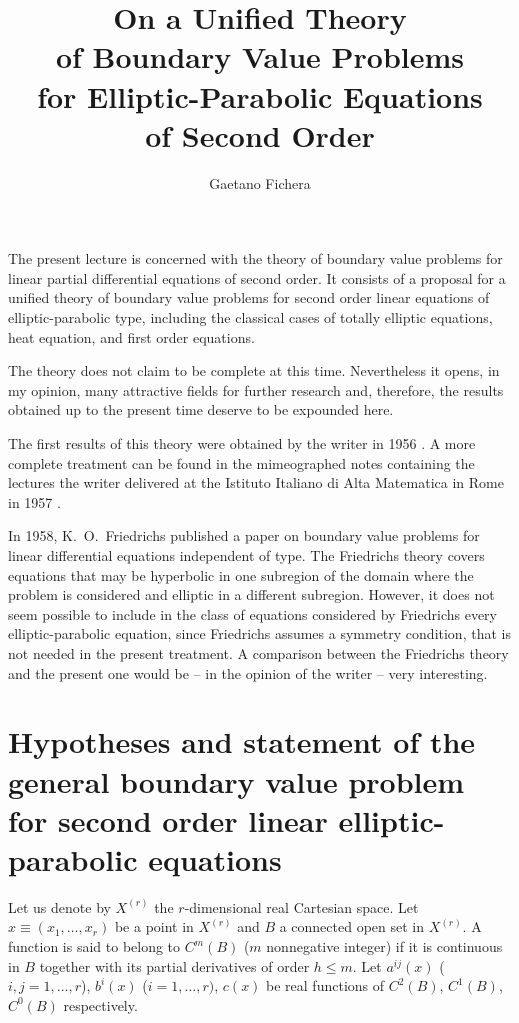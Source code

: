 \documentclass[a4paper,12pt,leqno]{article}
\title{On a Unified Theory \\
of Boundary Value Problems \\
for Elliptic-Parabolic Equations \\
of Second Order}
\author{Gaetano Fichera}
\date{}
\numberwithin{equation}{section}
\begin{document}
\maketitle

The present lecture is concerned with the theory of boundary value problems for linear partial differential equations of second order. 
It consists of a proposal for a unified theory of boundary value problems for second order linear equations of elliptic-parabolic type, including the classical cases of totally elliptic equations, heat equation, and first order equations.

The theory does not claim to be complete at this time. 
Nevertheless it opens, in my opinion, many attractive fields for further research and, therefore, the results obtained up to the present time deserve to be expounded here.

The first results of this theory were obtained by the writer in 1956
\cite{4}. 
A more complete treatment can be found in the mimeographed notes containing the lectures the writer delivered at the Istituto Italiano di Alta Matematica in Rome in 1957 \cite{5}.

In 1958, K.\ O.\ Friedrichs published a paper \cite{7} on boundary value problems for linear differential equations independent of type. 
The Friedrichs theory covers equations that may be hyperbolic in one subregion of the domain where the problem is considered and elliptic in a different subregion. 
However, it does not seem possible to include in the class of equations considered by Friedrichs every elliptic-parabolic equation, since Friedrichs assumes a symmetry condition, that is not needed in the present treatment.
A comparison between the Friedrichs theory and the present one would be -- in the opinion of the writer -- very interesting.

\section{Hypotheses and statement of the general boundary value problem for second order linear elliptic-parabolic equations}

Let us denote by $X^{(r)}$ the $r$-dimensional real Cartesian space.
Let $x \equiv\left(x_{1}, \ldots, x_{r}\right)$ be a point in $X^{(r)}$ and $B$ a connected open set in $X^{(r)}$.
A function is said to belong to $C^{m}(B)$ ($m$ nonnegative integer) if it is continuous in $B$ together with its partial derivatives of order $h \leq m$. Let $a^{i j}(x)$ ($i, j=1, \ldots, r$), $b^i(x)$ ($i=1, \ldots, r)$, $c(x)$ be real functions of $C^{2}(B)$, $C^{1}(B)$, $C^{0}(B)$ respectively.
\end{document}
